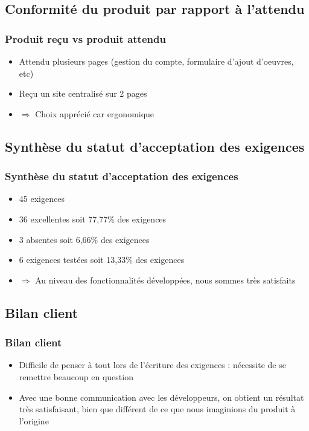 \documentclass{beamer}
\begin{document}
    \begin{frame}
    	\tableofcontents[currentsection]
    \end{frame}
  
    \subsection{Conformité du produit par rapport à l'attendu}
    \begin{frame}
      \frametitle{Produit reçu vs produit attendu}
      \begin{block}{}
        \begin{itemize}
          \item Attendu plusieurs pages (gestion du compte, formulaire d'ajout d'oeuvres, etc)
          \item Reçu un site centralisé sur 2 pages
          \item $ \Rightarrow $ Choix apprécié car ergonomique
        \end{itemize}
      \end{block}    
    \end{frame}
    
    \subsection{Synthèse du statut d'acceptation des exigences}
    \begin{frame}
      \frametitle{Synthèse du statut d'acceptation des exigences}
      \begin{block}{}
        \begin{itemize}
          \item 45 exigences
          \item 36 excellentes soit 77,77\% des exigences
          \item 3 absentes soit 6,66\% des exigences
          \item 6 exigences testées soit 13,33\% des exigences
          \item $ \Rightarrow $ Au niveau des fonctionnalités développées, nous sommes très satisfaits
        \end{itemize}
      \end{block}
    \end{frame}
    
    \subsection{Bilan client}
    \begin{frame}
      \frametitle{Bilan client}
      \begin{block}{}
        \begin{itemize}
          \item Difficile de penser à tout lors de l'écriture des exigences : nécessite de se remettre beaucoup en question
          \item Avec une bonne communication avec les développeurs, on obtient un résultat très satisfaisant, bien que différent de ce que nous imaginions du produit à l'origine
        \end{itemize}
      \end{block}
    \end{frame}
\end{document}
